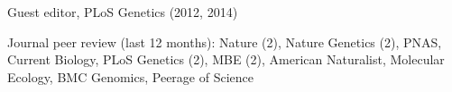 \documentclass[letterpaper]{article}
\newcommand{\ignore}[1]{}
\renewenvironment{itemize}{
  \begin{list}{}{
    \setlength{\leftmargin}{1.5em}
  }
}{
  \end{list}
}
\begin{document}
\begin{itemize}
\item Guest editor, PLoS Genetics (2012, 2014)
\item Journal peer review (last 12 months): \ignore{8/13,10/13} Nature (2), \ignore {1/14, 3/14} Nature Genetics (2), \ignore{6/13,7/13,8/13} PNAS, \ignore{8/13} Current Biology, \ignore{3/13,4/14,4/14} PLoS Genetics (2), \ignore{7/14,7/14} MBE (2), \ignore {3/14} American Naturalist, \ignore{1/14} Molecular Ecology, \ignore{1/14} BMC Genomics, \ignore{9/13} Peerage of Science

\end{itemize}

\end{document}
